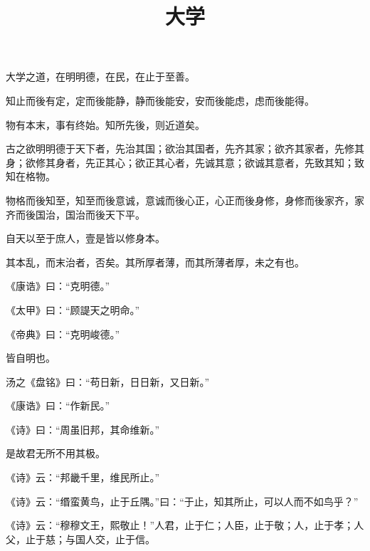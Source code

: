 \documentclass[twoside,openany]{book}
\title{大学}
\author{\xpinyin{曾}{zeng1}\xpinyin{参}{shen1}}
\date{}
\begin{document}
\maketitle
	
\noindent
	
	
\begin{pinyinscope}
大学之道，在明明德，在民，在止于至善。

知止而後有定，定而後能静，静而後能安，安而後能虑，虑而後能得。

物有本末，事有终始。知所先後，则近道矣。

古之欲明明德于天下者，先治其国；欲治其国者，先齐其家；欲齐其家者，先修其身；欲修其身者，先正其心；欲正其心者，先诚其意；欲诚其意者，先致其知；致知在格物。

物格而後知至，知至而後意诚，意诚而後心正，心正而後身修，身修而後家齐，家齐而後国治，国治而後天下平。

自天以至于庶人，壹是皆以修身本。

其本乱，而末治者，否矣。其所厚者薄，而其所薄者厚，未之有也。

《康诰》曰：“克明德。”

《太甲》曰：“顾諟天之明命。”

《帝典》曰：“克明峻德。”

皆自明也。

汤之《盘铭》曰：“苟日新，日日新，又日新。”

《康诰》曰：“作新民。”

《诗》曰：“周虽旧邦，其命维新。”

是故君无所不用其极。

《诗》云：“邦畿千里，维民所止。”

《诗》云：“缗蛮黄鸟，止于丘隅。”曰：“于止，知其所止，可以人而不如鸟乎？”

《诗》云：“穆穆文王，熙敬止！”人君，止于仁；人臣，止于敬；人，止于孝；人父，止于慈；与国人交，止于信。


\end{pinyinscope}
\end{document}

